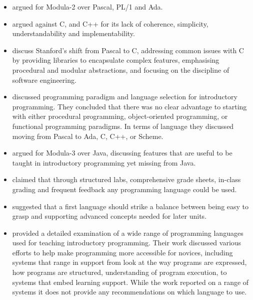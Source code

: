 %
%



\begin{itemize}[noitemsep,nolistsep]
	\item \citet{Koffman:1988} argued for Modula-2 over Pascal, PL/1 and Ada.
	\item \citet{Mody:1991} argued against C, and C++ for its lack of coherence, simplicity, understandability and implementability. 

	\item \citet{Roberts:1993} discuss Stanford's shift from Pascal to C, addressing common issues with C by providing libraries to encapsulate complex features, emphasising procedural and modular abstractions, and focusing on the discipline of software engineering.

	\item \citet{Brilliant:1996} discussed programming paradigm and language selection for introductory programming. They concluded that there was no clear advantage to starting with either procedural programming, object-oriented programming, or functional programming paradigms. In terms of language they discussed moving from Pascal to Ada, C, C++, or Scheme.

	\item \citet{Boszormenyi:1998} argued for Modula-3 over Java, discussing features that are useful to be taught in introductory programming yet missing from Java.

	\item \citet{Howell:2003} claimed that through structured labs, comprehensive grade sheets, in-class grading and frequent feedback any programming language could be used.

	\item \citet{Gupta:2004} suggested that a first language should strike a balance between being easy to grasp and supporting advanced concepts needed for later units.

	\item \citet{Kelleher:2005} provided a detailed examination of a wide range of programming languages used for teaching introductory programming. Their work discussed various efforts to help make programming more accessible for novices, including systems that range in support from look at the way programs are expressed, how programs are structured, understanding of program execution, to systems that embed learning support. While the work reported on a range of systems it does not provide any recommendations on which language to use.


\end{itemize}
